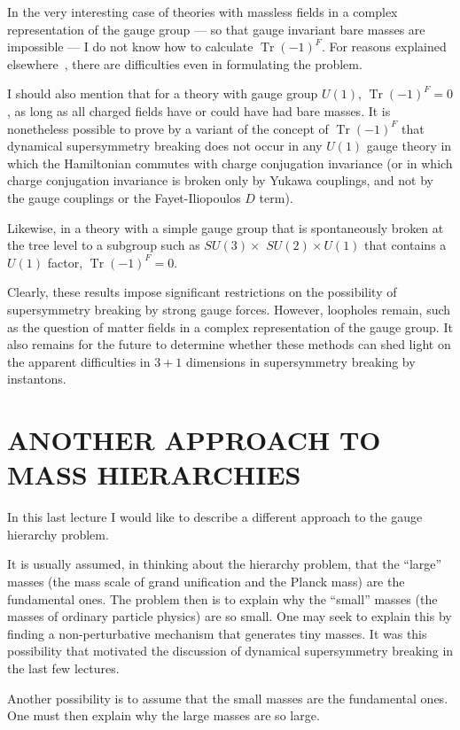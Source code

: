 \documentclass[11pt,a4paper]{article}
\begin{document}
In the very interesting case of theories with massless fields
in a complex representation of the gauge group --- so that gauge invariant
bare masses are impossible --- I do not know how to calculate
$\operatorname{Tr}(-1)^F$. For reasons explained elsewhere~\cite{ref13}, there are difficulties
even in formulating the problem.

I should also mention that for a theory with gauge group $U(1)$,
$\operatorname{Tr}(-1)^F = 0$, as long as all charged fields have or could have had
bare masses. It is nonetheless possible to prove by a variant of
the concept of $\operatorname{Tr}(-1)^F$ that dynamical supersymmetry breaking does
not occur in any $U(1)$ gauge theory in which the Hamiltonian commutes
with charge conjugation invariance (or in which charge conjugation
invariance is broken only by Yukawa couplings, and not by the gauge
couplings or the Fayet-Iliopoulos $D$ term).

Likewise, in a theory with a simple gauge group that is spontaneously
broken at the tree level to a subgroup such as $SU(3) \times$
$SU(2) \times U(1)$ that contains a $U(1)$ factor, $\operatorname{Tr}(-1)^F = 0$.

Clearly, these results impose significant restrictions on the
possibility of supersymmetry breaking by strong gauge forces. However,
loopholes remain, such as the question of matter fields in a
complex representation of the gauge group. It also remains for the
future to determine whether these methods can shed light on the
apparent difficulties in $3+1$ dimensions in supersymmetry breaking by
instantons.

\section{ANOTHER APPROACH TO MASS HIERARCHIES}

In this last lecture I would like to describe a different approach
to the gauge hierarchy problem.

It is usually assumed, in thinking about the hierarchy problem,
that the ``large'' masses (the mass scale of grand unification and the
Planck mass) are the fundamental ones. The problem then is to explain
why the ``small'' masses (the masses of ordinary particle physics)
are so small. One may seek to explain this by finding a non-perturbative
mechanism that generates tiny masses. It was this possibility
that motivated the discussion of dynamical supersymmetry breaking in
the last few lectures.

Another possibility is to assume that the small masses are the
fundamental ones. One must then explain why the large masses are so
large.
\end{document}
